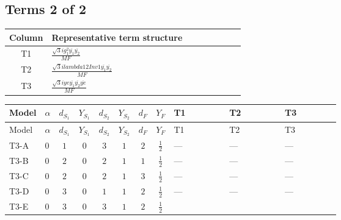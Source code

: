 \documentclass[8pt]{article}
\begin{document}
\begin{landscape}
\subsection*{Terms 2 of 2}
\begin{center}
\begin{tabular}{@{}c >{\raggedright\arraybackslash}p{0.82\linewidth}@{}}
\toprule
Column & Representative term structure \\
\midrule
T1 & \(\displaystyle \frac{\sqrt{3} i g_{1}^{2} \overline{y_{1}} \overline{y_{2}}}{MF}\) \\
\midrule
T2 & \(\displaystyle \frac{\sqrt{3} i lambda12Inv1 \overline{y_{1}} \overline{y_{2}}}{MF}\) \\
\midrule
T3 & \(\displaystyle \frac{\sqrt{3} i ye \overline{y_{1}} \overline{y_{2}} \overline{ye}}{MF}\) \\
\midrule
\bottomrule
\end{tabular}
\end{center}
\smallskip
\tiny
\begin{longtable}{@{}llcccccc >{\raggedright\arraybackslash}p{0.21\linewidth} >{\raggedright\arraybackslash}p{0.21\linewidth} >{\raggedright\arraybackslash}p{0.21\linewidth}@{}}
\toprule
Model & $\alpha$ & $d_{S_1}$ & $Y_{S_1}$ & $d_{S_2}$ & $Y_{S_2}$ & $d_F$ & $Y_F$ & T1 & T2 & T3 \\
\midrule
\endfirsthead
\toprule
Model & $\alpha$ & $d_{S_1}$ & $Y_{S_1}$ & $d_{S_2}$ & $Y_{S_2}$ & $d_F$ & $Y_F$ & T1 & T2 & T3 \\
\midrule
\endhead
T3-A & $0$ & $1$ & $0$ & $3$ & $1$ & $2$ & $\frac{1}{2}$ & --- & --- & --- \\
\midrule
T3-B & $0$ & $2$ & $0$ & $2$ & $1$ & $1$ & $\frac{1}{2}$ & --- & --- & --- \\
\midrule
T3-C & $0$ & $2$ & $0$ & $2$ & $1$ & $3$ & $\frac{1}{2}$ & --- & --- & --- \\
\midrule
T3-D & $0$ & $3$ & $0$ & $1$ & $1$ & $2$ & $\frac{1}{2}$ & --- & --- & --- \\
\midrule
T3-E & $0$ & $3$ & $0$ & $3$ & $1$ & $2$ & $\frac{1}{2}$ & \scriptsize\adjustbox{max width=\linewidth}{$\begin{gathered} - \frac{\sqrt{3} i g_{1}^{2} \overline{y_{1}} \overline{y_{2}}}{8 MF}\end{gathered}$} & \scriptsize\adjustbox{max width=\linewidth}{$\begin{gathered} \frac{\sqrt{3} i lambda12Inv1 \overline{y_{1}} \overline{y_{2}}}{6 MF}\end{gathered}$} & \scriptsize\adjustbox{max width=\linewidth}{$\begin{gathered} \frac{\sqrt{3} i ye \overline{y_{1}} \overline{y_{2}} \overline{ye}}{12 MF}\end{gathered}$} \\
\midrule
\bottomrule
\end{longtable}
\clearpage

\end{landscape}
\end{document}

